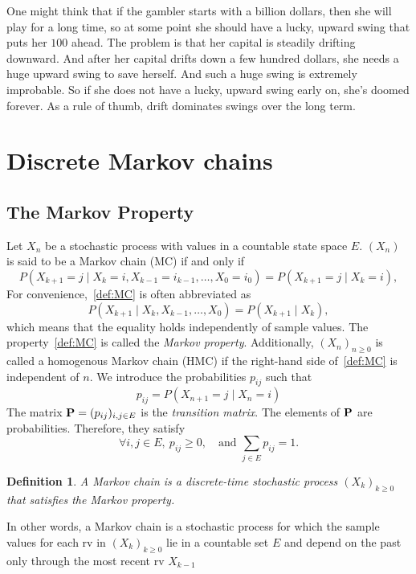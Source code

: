 \documentclass[12pt,a4paper]{article}
\newtheorem{definition}{Definition}
\newcommand{\bP}{\bold P}
\begin{document}
		One might think that if the gambler starts with a billion dollars, then she will play for a long time, so at some point she should have a lucky, upward swing that puts her $100$ ahead. The problem is that her capital is steadily drifting downward. And after her capital drifts down a few hundred dollars, she needs a huge upward swing to save herself. And such a huge swing is extremely improbable. So if she does not have a lucky, upward swing early on, she's doomed forever. As a rule of thumb, drift dominates swings over the long term.
		
	
	
\newpage
\section{Discrete Markov chains}
\subsection{The Markov Property}
Let $X_n$ be a stochastic process with values in a countable state space $E$. $(X_n)$ is said to be a Markov chain (MC) if and only if
\begin{equation}\label{def:MC}
P(X_{k+1} = j \mid X_k = i, X_{k-1} = i_{k-1}, \dots, X_0 = i_0) = P(X_{k+1} = j \mid X_k = i),
\end{equation}
For convenience,~\eqref{def:MC} is often abbreviated as 
\begin{equation}\label{def:MC}
	P(X_{k+1} \mid X_k, X_{k-1} , \dots, X_0) = P(X_{k+1} \mid X_k),
\end{equation}
which means that the equality holds independently of sample values.
The property~\eqref{def:MC} is called the \textit{Markov property}.
Additionally, $(X_n)_{n\geq 0}$ is called a homogenous Markov chain (HMC) if the right-hand side of~\eqref{def:MC} is independent of $n$.
We introduce the probabilities $p_{ij}$ such that
\begin{equation}
	p_{ij} =  P(X_{n+1} = j \mid X_n = i)
\end{equation}
The matrix $\bold P = (p_{ij})_{i,j\in E}$ is the \textit{transition matrix}.
The elements of $\bP$ are probabilities. Therefore, they satisfy
\begin{equation}
	 \forall i,j\in E, \ p_{ij}\geq 0,\quad \text{and } \sum_{j \in E} p_{ij} = 1.
\end{equation}
\begin{definition}
	A \textit{Markov chain} is a discrete-time stochastic process $(X_k)_{k\geq 0}$ that satisfies the Markov property.
	\end{definition}
	In other words, a Markov chain is a stochastic process for which the sample values for each rv in $(X_k)_{k\geq 0}$ lie in a countable set $E$ and depend on the past only through the most recent rv $X_{k-1}$
	
\end{document}
